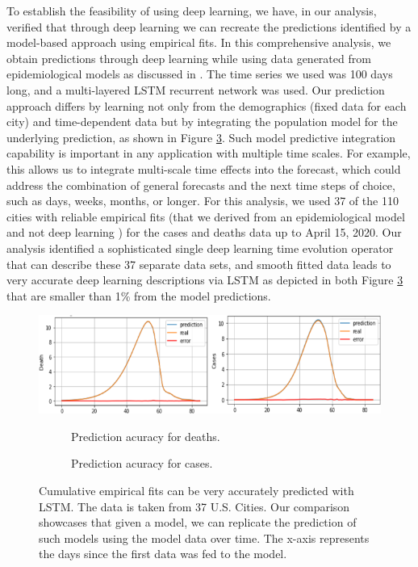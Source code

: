 \documentclass[letterpaper, inpress]{jds} %
\renewcommand{\_}{%
    \textunderscore\hspace{0pt}%
}
\begin{document}
To establish the feasibility of using deep learning, we have, in our
analysis, verified that through deep learning we can recreate the
predictions identified by a model-based approach using empirical
fits. In this comprehensive analysis, we obtain predictions through
deep learning while using data generated from epidemiological models
as discussed in \citep{marsland20-covid-paper}. The time series we used
was 100 days long, and a multi-layered LSTM
recurrent network was used. Our prediction approach differs by
learning not only from the demographics (fixed data for each city) and
time-dependent data but by integrating the population model for the
underlying prediction, as shown in Figure \ref{fig:magic-1}. Such model
predictive integration capability is important in any application with
multiple time scales. For example, this allows us to integrate
multi-scale time effects into the forecast, which could address the
combination of general forecasts and the next time steps of choice,
such as days, weeks, months, or longer. For this analysis, we used 37
of the 110 cities with reliable empirical fits (that we derived from
an epidemiological model and not deep learning
\citep{marsland20-covid-paper}) for the cases and deaths data up to
April 15, 2020. Our analysis identified a sophisticated single deep
learning time evolution operator that can describe these 37 separate
data sets, and smooth fitted data leads to very accurate deep learning
descriptions via LSTM as depicted in both Figure \ref{fig:magic-1}
that are smaller than 1\% from the model predictions.



\begin{figure}[!h]
    \centering
    \includegraphics[width=1.0\textwidth]{images/magic-1.png}

    \begin{subfigure}{.4\textwidth}
      \centering
      \caption{Prediction acuracy for deaths.}
      \label{fig:magic-a}
    \end{subfigure}
    \begin{subfigure}{.4\textwidth}
      \centering
      \caption{Prediction acuracy for cases.}
      \label{fig:magic-b}
    \end{subfigure}

    \caption{Cumulative empirical fits can be very accurately
      predicted with LSTM. The data is taken from 37 U.S. Cities. Our
      comparison showcases that given a model, we can replicate the
      prediction of such models using the model data over time. The
      x-axis represents the days since the first data was fed to the
      model.}
    \label{fig:magic-1}
\end{figure}
\end{document}
